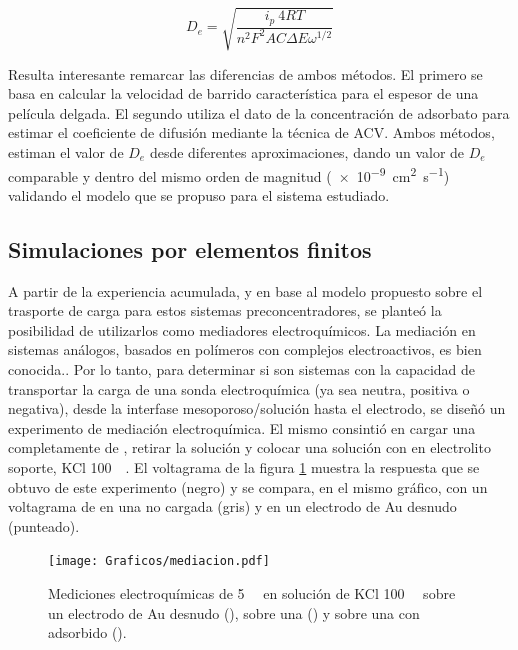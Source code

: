     	 		\begin{equation}
					D_e=\sqrt{\frac{i_p\ 4RT}{n^2 F^2 A C \Delta E \omega ^{1/2}}}
					\label{eq:acv}
				 \end{equation}

		
		 Resulta interesante remarcar las diferencias de ambos métodos. El primero se basa en calcular la velocidad de barrido característica para el espesor de una película delgada. El segundo utiliza el dato de la concentración de adsorbato para estimar el coeficiente de difusión mediante la técnica de ACV. Ambos métodos, estiman el valor de $D_e$ desde diferentes aproximaciones, dando un valor de $D_e$ comparable y dentro del mismo orden de magnitud (\SI{e-9}{\square\cm\per\second}) validando el modelo que se propuso para el sistema estudiado.
			
	\subsection{Simulaciones por elementos finitos}	

		A partir de la experiencia acumulada, y en base al modelo propuesto sobre el trasporte de carga para estos sistemas preconcentradores, se planteó la posibilidad de utilizarlos como mediadores electroquímicos. 
    	La mediación en sistemas análogos, basados en polímeros con complejos electroactivos, es bien conocida.\cite{Kolb1993,ybarra2005}. Por lo tanto, para determinar si son sistemas con la capacidad de transportar la carga de una sonda electroquímica (ya sea neutra, positiva o negativa), desde la interfase mesoporoso/solución hasta el electrodo, se diseñó un experimento de mediación electroquímica. El mismo consintió en cargar una \pdmF\space completamente de \ru, retirar la solución y colocar una solución con \fc\space en electrolito soporte, KCl \SI{100}{\milli\Molar}. El voltagrama de la figura \ref{fig:mediacion} muestra la respuesta que se obtuvo de este experimento (negro) y se compara, en el mismo gráfico, con un voltagrama de \fc\space en una \pdmF\space no cargada (gris) y en un electrodo de Au  desnudo (punteado).  

        	\begin{figure}[b!]	
					\centering
			 	    \texttt{[image: Graficos/mediacion.pdf]}
			        \caption[Voltagrama de \ru\space y \fc.]{Mediciones electroquímicas de \fc\space \SI{5}{\milli\Molar} en solución de KCl \SI{100}{\milli\Molar} sobre un electrodo de Au  desnudo (\usebox{\punteado}), sobre una \pdmF\space (\usebox{\gris}) y sobre una \pdmF\space con \ru\space adsorbido (\usebox{\negro}).}
			        \label{fig:mediacion}
			      	\end{figure}

